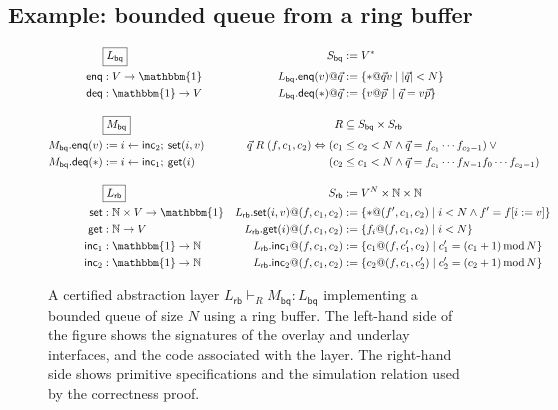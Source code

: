 \documentclass[draft,11pt]{report}
\newcommand{\kw}[1]{\ensuremath{ \mathsf{#1} }}
\begin{document}

\subsection{Example: bounded queue from a ring buffer}

\begin{figure} %
  \small
    \begin{align*}
      & \fbox{$L_\kw{bq}$} &
        S_\kw{bq} &:= V^* \\
      \kw{enq} &: V \rightarrow \mathbbm{1} &
        L_\kw{bq}.\kw{enq}(v)@\vec{q} &:= \{ * @ \vec{q} v \mid |\vec{q}| < N \} \\
      \kw{deq} &: \mathbbm{1} \rightarrow V &
        L_\kw{bq}.\kw{deq}(*)@\vec{q} &:= \{ v @ \vec{p} \: \mid \vec{q} = v \vec{p} \}
      \\[1em]
      & \fbox{$M_\kw{bq}$} &
        R &\subseteq S_\kw{bq} \times S_\kw{rb} \\
      M_\kw{bq}.\kw{enq}(v) &:= i \leftarrow \kw{inc}_2 ; \: \kw{set}(i, v) &
        \vec{q} \mathrel{R} (f, c_1, c_2) \Leftrightarrow
           (c_1 &\le c_2 < N \wedge
            \vec{q} = f_{c_1} \cdots f_{c_2-1}) \vee {}
      \\
      M_\kw{bq}.\kw{deq}(*) &:= i \leftarrow \kw{inc}_1 ; \: \kw{get}(i) &
           (c_2 &\le c_1 < N \wedge
            \vec{q} = f_{c_1} \cdots f_{N-1} f_0 \cdots f_{c_2 - 1})
      \\[1em]
      & \fbox{$L_\kw{rb}$} &
        S_\kw{rb} &:= V^N \times \mathbb{N} \times \mathbb{N}
      \\
      \kw{set} &: \mathbb{N} \times V \rightarrow \mathbbm{1} &
        L_\kw{rb}.\kw{set}(i, v)@(f, c_1, c_2) &:=
        \{ *@(f', c_1, c_2) \mid i < N \wedge f' = f[i := v] \}
      \\
      \kw{get} &: \mathbb{N} \rightarrow V &
        L_\kw{rb}.\kw{get}(i)@(f, c_1, c_2) &:=
        \{ f_i@(f, c_1, c_2) \mid i < N \}
      \\
      \kw{inc}_1 &: \mathbbm{1} \rightarrow \mathbb{N} &
        L_\kw{rb}.\kw{inc}_1@(f, c_1, c_2) &:=
        \{ c_1@(f, c_1', c_2) \mid
           c_1' = (c_1 + 1) \mathop{\mathrm{mod}} N \}
      \\
      \kw{inc}_2 &: \mathbbm{1} \rightarrow \mathbb{N} &
        L_\kw{rb}.\kw{inc}_2@(f, c_1, c_2) &:=
        \{ c_2@(f, c_1, c_2') \mid
           c_2' = (c_2 + 1) \mathop{\mathrm{mod}} N \}
    \end{align*}
  \caption{A certified abstraction layer
    $L_\kw{rb} \vdash_R M_\kw{bq} : L_\kw{bq}$
    implementing a bounded queue of size $N$
    using a ring buffer.
    The left-hand side of the figure shows
    the signatures of the overlay and underlay interfaces,
    and the code associated with the layer.
    The right-hand side shows primitive specifications
    and the simulation relation used by the correctness proof.}
  \label{fig:cal}
\end{figure}
\end{document}
